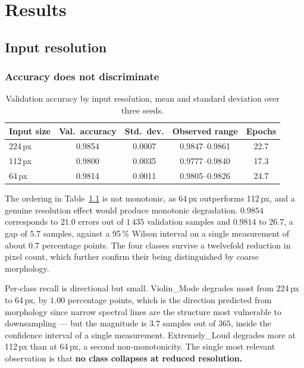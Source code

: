 \chapter{Results}
\label{ch:results}

\section{Input resolution}
\label{sec:resolution}

\subsection{Accuracy does not discriminate}

\begin{table}[htbp]
\centering
\begin{tabular}{lcccc}
\toprule
Input size & Val.\ accuracy & Std.\ dev. & Observed range & Epochs \\
\midrule
224\,px & 0.9854 & 0.0007 & 0.9847--0.9861 & 22.7 \\
112\,px & 0.9800 & 0.0035 & 0.9777--0.9840 & 17.3 \\
64\,px  & 0.9814 & 0.0011 & 0.9805--0.9826 & 24.7 \\
\bottomrule
\end{tabular}
\caption{Validation accuracy by input resolution, mean and standard deviation
over three seeds.}
\label{tab:resolution-accuracy}
\end{table}

The ordering in Table~\ref{tab:resolution-accuracy} is not monotonic, as 64\,px
outperforms 112\,px, and a genuine resolution effect would produce monotonic
degradation. $0.9854$ corresponds to $21.0$ errors out of
$1\,435$ validation samples and $0.9814$ to $26.7$, a gap of $5.7$ samples,
against a 95\,\% Wilson interval on a single measurement of about $0.7$
percentage points. The four classes survive a twelvefold reduction in pixel
count, which further confirm their being distinguished by coarse morphology.

Per-class recall is directional but small. Violin\_Mode degrades most from
224\,px to 64\,px, by $1.00$ percentage points, which is the direction predicted
from morphology since narrow spectral lines are the structure most vulnerable to
downsampling --- but the magnitude is $3.7$ samples out of $365$, inside the
confidence interval of a single measurement. Extremely\_Loud degrades more at
112\,px than at 64\,px, a second non-monotonicity. The single most 
relevant observation is that \textbf{no class collapses at
reduced resolution.}

